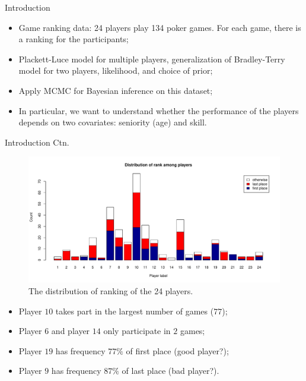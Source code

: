 \begin{frame}{Introduction}
    \begin{itemize}
        \item Game ranking data: 24 players play 134 poker games. For each game, there is a ranking for the participants;
        \item Plackett-Luce model for multiple players, generalization of Bradley-Terry model for two players, likelihood, and choice of prior;
        \item Apply MCMC for Bayesian inference on this dataset;
        \item In particular, we want to understand whether the performance of the players depends on two covariates: seniority (age) and skill.
    \end{itemize}
\end{frame}

\begin{frame}{Introduction Ctn.}
    \begin{figure}
        \centering
        \includegraphics[width=.82\linewidth]{img/player.pdf}
        \caption{The distribution of ranking of the 24 players.}
        \label{fig:players}
    \end{figure}
    \begin{itemize}
        \item Player $10$ takes part in the largest number of games ($77$);
        \item Player $6$ and player $14$ only participate in $2$ games;
        \item Player $19$ has frequency $77\%$ of first place (good player?);
        \item Player $9$ has frequency $87\%$ of last place (bad player?).
    \end{itemize}
\end{frame}

